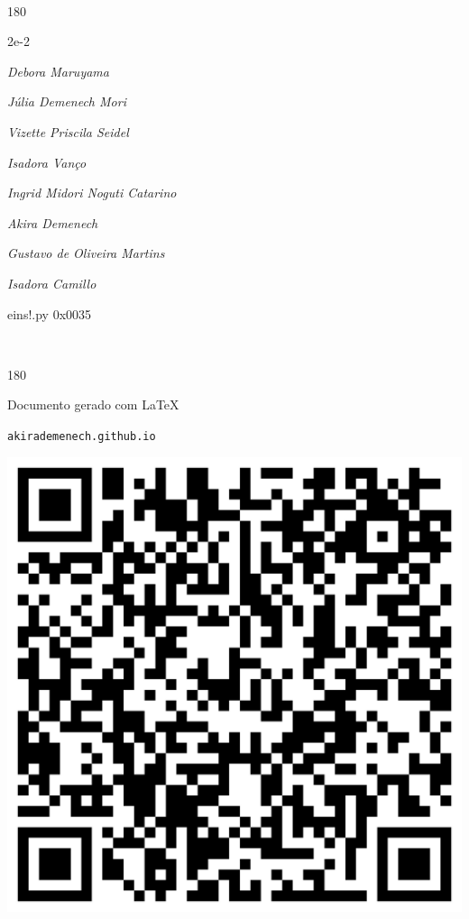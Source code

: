 \documentclass[12pt]{article}
\begin{document}
	\ 
	\vfill
	\begin{turn}{180}	
		\begin{minipage}{\textwidth}
		  	\ttfamily %
			\centering
			{\Huge 2e-2}
		  
			\hfill
		  
			

\textit{\small Debora Maruyama}

\textit{\small Júlia Demenech Mori}

\textit{\small Vizette Priscila Seidel}

\textit{\small Isadora Vanço}

\textit{\small Ingrid Midori Noguti Catarino}

\textit{\small Akira Demenech}

\textit{\small Gustavo de Oliveira Martins}

\textit{\small Isadora Camillo}

\bigskip

eins!.py
0x0035


		\end{minipage}	
	\end{turn}
	\vfill
	\

\pagebreak

	\begin{turn}{180}	
		\begin{minipage}{\textwidth}		  
		  Documento gerado com \LaTeX			
		  
		  \texttt{akirademenech.github.io}

		  \includegraphics[height=0.3\textheight]{2e-2.pdf}

		\end{minipage}	
	\end{turn}  
		  
\end{document}
